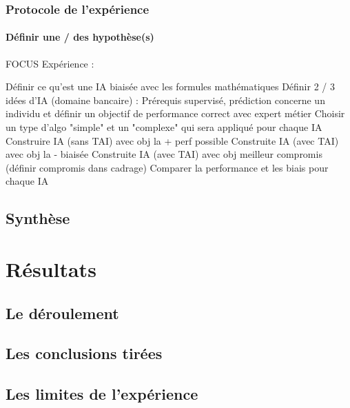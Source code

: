 \documentclass[10pt, french, a4paper]{article}
\begin{document}
\subsubsection{Protocole de l'expérience}

\paragraph{Définir une / des hypothèse(s)}

FOCUS Expérience :

Définir ce qu'est une IA biaisée avec les formules mathématiques
Définir 2 / 3 idées d'IA (domaine bancaire) : Prérequis supervisé, prédiction concerne un individu et définir un objectif de performance correct avec expert métier
Choisir un type d'algo "simple" et un "complexe" qui sera appliqué pour chaque IA
Construire IA (sans TAI) avec obj la + perf possible
Construite IA (avec TAI) avec obj la - biaisée
Construite IA (avec TAI) avec obj meilleur compromis (définir compromis dans cadrage)
Comparer la performance et les biais pour chaque IA

\subsection{Synthèse}


\newpage
\section{Résultats}


\subsection{Le déroulement}


\subsection{Les conclusions tirées}


\subsection{Les limites de l'expérience}

\end{document}
